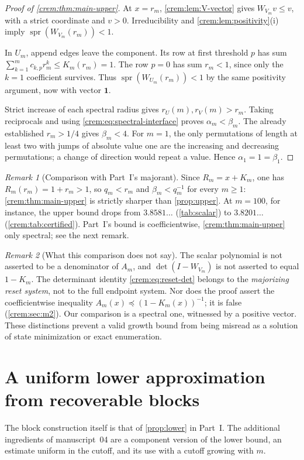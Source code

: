 \documentclass[11pt,a4paper]{article}
\theoremstyle{definition}\newaliascnt{definition}{theorem}
\theoremstyle{remark}\newaliascnt{remark}{theorem}
\newtheorem{remark}[remark]{Remark}
\newcommand{\spr}{\operatorname{spr}}
\newcommand{\preceqc}{\preceq}
\newcommand{\one}{\mathbf 1}
\begin{document}
\begin{proof}[Proof of \cref{crem:thm:main-upper}]
At $x=r_m$, \cref{crem:lem:V-vector} gives $W_{V_m}v\le v$, with a strict
coordinate and $v>0$. Irreducibility and
\cref{crem:lem:positivity}(i) imply $\spr(W_{V_m}(r_m))<1$.

In $U_m$, append edges leave the component. Its row at first threshold $p$
has sum $\sum_{k=1}^m c_{k,p}r_m^k\le K_m(r_m)=1$. The row $p=0$ has sum
$r_m<1$, since only the $k=1$ coefficient survives. Thus
$\spr(W_{U_m}(r_m))<1$ by the same positivity argument, now with vector
$\one$.

Strict increase of each spectral radius gives $r_U(m),r_V(m)>r_m$. Taking
reciprocals and using \eqref{crem:eq:spectral-interface} proves
$\alpha_m<\beta_m$. The already established $r_m>1/4$ gives $\beta_m<4$.
For $m=1$, the only permutations of length at least two with jumps of
absolute value one are the increasing and decreasing permutations; a change
of direction would repeat a value. Hence $\alpha_1=1=\beta_1$.
\end{proof}

\begin{remark}[Comparison with Part~I's majorant]\label{crem:rem:vs-upper}
Since $R_m=x+K_m$, one has $R_m(r_m)=1+r_m>1$, so $q_m<r_m$ and
$\beta_m<q_m^{-1}$ for every $m\ge1$: \cref{crem:thm:main-upper} is
strictly sharper than \cref{prop:upper}. At $m=100$, for instance, the
upper bound drops from $3.8581\ldots$ (\cref{tab:scalar}) to
$3.8201\ldots$ (\cref{crem:tab:certified}). Part~I's bound is
coefficientwise, \cref{crem:thm:main-upper} only spectral; see the next
remark.
\end{remark}

\begin{remark}[What this comparison does not say]\label{crem:rem:not-quotient}
The scalar polynomial is not asserted to be a denominator of $A_m$, and
$\det(I-W_{V_m})$ is not asserted to equal $1-K_m$. The determinant identity
\eqref{crem:eq:reset-det} belongs to the \emph{majorizing reset system}, not
to the full endpoint system. Nor does the proof assert the coefficientwise
inequality $A_m(x)\preceqc(1-K_m(x))^{-1}$; it is false
(\cref{crem:sec:m2}). Our comparison is a spectral one, witnessed by a
positive vector. These distinctions prevent a valid growth bound from being
misread as a solution of state minimization or exact enumeration.
\end{remark}

\section{A uniform lower approximation from recoverable blocks}
\label{crem:sec:blocks}
The block construction itself is that of \cref{prop:lower} in Part~I.
The additional ingredients of manuscript~04 are a component version of the lower
bound, an estimate uniform in the cutoff, and its use with a cutoff growing
with $m$.
\end{document}
